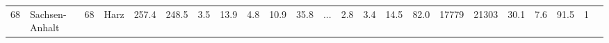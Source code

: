 \documentclass[11pt]{article}
\begin{document}
\begin{tabular}{r|llllllllllllllllllllll}
	68 & Sachsen-Anhalt                                                                     & 68                                                                                 & Harz                                                                               & 257.4                                                                              & 248.5                                                                              &  3.5                                                                               & 13.9                                                                               & 4.8                                                                                & 10.9                                                                               & 35.8                                                                               & ...                                                                                &  2.8                                                                               &  3.4                                                                               & 14.5                                                                               & 82.0                                                                               & 17779                                                                              & 21303                                                                              & 30.1                                                                               &  7.6                                                                               &  91.5                                                                              & 1                                                                                 \\

\end{tabular}
\end{document}
